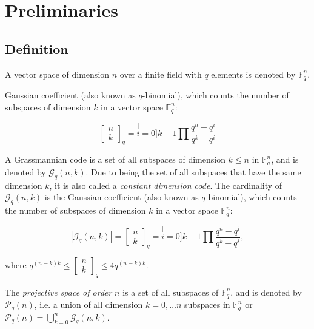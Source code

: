 \chapter{Preliminaries} \label{chap:preliminaries}

\section{Definition}
\begin{defn}
 A vector space of dimension $n$ over a finite field with $q$ elements
is denoted by $\ensuremath{\mathbb{F}}_{q}^{n}$.
\end{defn}
%
\begin{defn}
 Gaussian coefficient (also known as $q$-binomial), which counts
the number of subspaces of dimension $k$ in a vector space $\ensuremath{\mathbb{F}}_{q}^{n}$:

\[
\left[\begin{array}{c}
n\\
k
\end{array}\right]_{q}=\stackrel[i=0]{k-1}{\prod}\frac{q^{n}-q^{i}}{q^{k}-q^{i}}
\]
\end{defn}
%
\begin{defn}
 A Grassmannian code is a set of all subspaces of dimension $k\leq n$
in $\ensuremath{\mathbb{F}}_{q}^{n}$, and is denoted by $\mathcal{G}_{q}\left(n,k\right)$.
Due to being the set of all subspaces that have the same dimension
$k$, it is also called a \textit{constant dimension code}. The cardinality
of $\mathcal{G}_{q}\left(n,k\right)$ is the Gaussian coefficient
(also known as $q$-binomial), which counts the number of subspaces
of dimension $k$ in a vector space $\ensuremath{\mathbb{F}}_{q}^{n}$:

\[
\left|\mathcal{G}_{q}\left(n,k\right)\right|=\left[\begin{array}{c}
n\\
k
\end{array}\right]_{q}=\stackrel[i=0]{k-1}{\prod}\frac{q^{n}-q^{i}}{q^{k}-q^{i}},
\]

where $q^{\left(n-k\right)k}\leq\left[\begin{array}{c}
n\\
k
\end{array}\right]_{q}\leq4q^{\left(n-k\right)k}$.
\end{defn}
%
\begin{defn}
 The \textit{projective space of order} $n$ is a set of all subspaces
of $\ensuremath{\mathbb{F}}_{q}^{n}$, and is denoted by $\mathcal{P}_{q}\left(n\right)$,
i.e. a union of all dimension $k=0,\ldots n$ subspaces in $\ensuremath{\mathbb{F}}_{q}^{n}$
or $\mathcal{P}_{q}\left(n\right)=\bigcup_{k=0}^{n}\mathcal{G}_{q}\left(n,k\right)$.
\end{defn}
